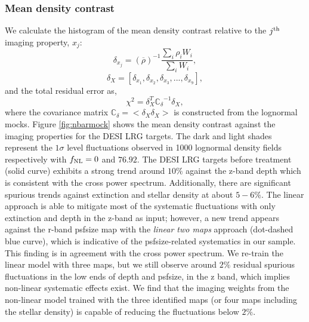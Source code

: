 \subsubsection{Mean density contrast}
We calculate the histogram of the mean density contrast relative to the $j^{\rm th}$ imaging property, $x_{j}$:
\begin{equation}
\delta_{x_{j}} = ({\overline{\rho}})^{-1} \frac{\sum_{i} \rho_{i} W_{i}}{\sum_{i} W_{i}},
\end{equation}
\begin{equation}
\delta_{X} = [\delta_{x_{1}}, \delta_{x_{2}}, \delta_{x_{3}}, ..., \delta_{x_{9}}],
\end{equation}
and the total residual error as,
\begin{equation}
\chi^{2} = \delta_{X}^{T} \mathbb{C_{\delta}}^{-1} \delta_{X},
\end{equation}
where the covariance matrix $\mathbb{C}_{\delta} = < \delta_{X} \delta_{X}>$ is constructed from the lognormal mocks. Figure \ref{fig:nbarmock} shows the mean density contrast against the imaging properties for the DESI LRG targets. The dark and light shades represent the $1\sigma$ level fluctuations observed in 1000 lognormal density fields respectively with $f_{\rm NL}=0$ and $76.92$. The DESI LRG targets before treatment (solid curve) exhibits a strong trend around $10\%$ against the z-band depth which is consistent with the cross power spectrum. Additionally, there are significant spurious trends against extinction and stellar density at about $5-6\%$. The linear approach is able to mitigate most of the systematic fluctuations with only extinction and depth in the z-band as input; however,  a new trend appears against the r-band psfsize map with the \textit{linear two maps} approach (dot-dashed blue curve), which is indicative of the psfsize-related systematics in our sample. This finding is in agreement with the cross power spectrum. We re-train the linear model with three maps, but we still observe around $2\%$ residual spurious fluctuations in the low ends of depth and psfsize, in the z band, which implies non-linear systematic effects exist. We find that the imaging weights from the non-linear model trained with the three identified maps (or four maps including the stellar density) is capable of reducing the fluctuations below $2\%$. 

